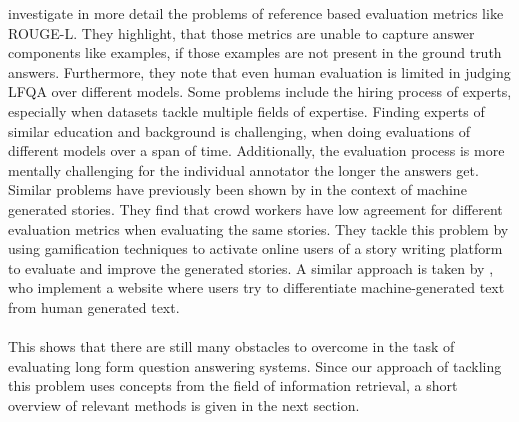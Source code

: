 \cite{krishna:2021} investigate in more detail the problems of reference based evaluation metrics like ROUGE-L. 
They highlight, that those metrics are unable to capture answer components like examples, if those examples are not present in the ground truth answers. 
Furthermore, they note that even human evaluation is limited in judging LFQA over different models.
Some problems include the hiring process of experts, especially when datasets tackle multiple fields of expertise.
Finding experts of similar education and background is challenging, when doing evaluations of different models over a span of time.
Additionally, the evaluation process is more mentally challenging for the individual annotator the longer the answers get.
Similar problems have previously been shown by \cite{akoury:2020} in the context of machine generated stories.
They find that crowd workers have low agreement for different evaluation metrics when evaluating the same stories.
They tackle this problem by using gamification techniques to activate online users of a story writing platform to evaluate and improve the generated stories.
A similar approach is taken by \cite{dugan:2020}, who implement a website where users try to differentiate machine-generated text from human generated text.
\\\\
This shows that there are still many obstacles to overcome in the task of evaluating long form question answering systems.
Since our approach of tackling this problem uses concepts from the field of information retrieval, a short overview of relevant methods is given in the next section.

